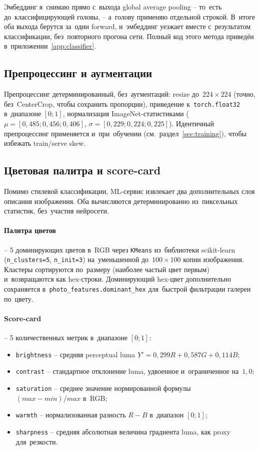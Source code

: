 \documentclass[a4paper,12pt]{diplom}
\begin{document}
Эмбеддинг я~снимаю прямо с~выхода global average pooling -- то~есть до~классифицирующей головы, -- а~голову применяю отдельной строкой. В~итоге оба выхода берутся за~один forward, и~эмбеддинг уезжает вместе с~результатом классификации, без~повторного прогона сети. Полный код этого метода приведён в~приложении~\ref{app:classifier}.

\subsection{Препроцессинг и аугментации}

Препроцессинг детерминированный, без~аугментаций: resize до~$224\times 224$ (точно, без~CenterCrop, чтобы сохранить пропорции), приведение к~\texttt{torch.float32} в~диапазоне $[0;1]$, нормализация ImageNet-статистиками ($\mu = [0{,}485; 0{,}456; 0{,}406]$, $\sigma = [0{,}229; 0{,}224; 0{,}225]$). Идентичный препроцессинг применяется и~при~обучении (см.~раздел~\ref{sec:training}), чтобы избежать train/serve skew.

\subsection{Цветовая палитра и score-card}

Помимо стилевой классификации, ML-сервис извлекает два дополнительных слоя описания изображения. Оба вычисляются детерминированно из~пиксельных статистик, без~участия нейросети.

\paragraph{Палитра цветов} -- 5 доминирующих цветов в~RGB через \texttt{KMeans} из~библиотеки scikit-learn~\cite{ScikitLearn} (\verb|n_clusters=5|, \verb|n_init=3|) на~уменьшенной до~$100\times 100$ копии изображения. Кластеры сортируются по~размеру (наиболее частый цвет первым) и~возвращаются как hex-строки. Доминирующий hex-цвет дополнительно сохраняется в~\verb|photo_features.dominant_hex| для~быстрой фильтрации галереи по~цвету.

\paragraph{Score-card} -- 5 количественных метрик в~диапазоне $[0;1]$:

\begin{itemize}
\item \texttt{brightness} -- средняя perceptual luma $Y' = 0{,}299 R + 0{,}587 G + 0{,}114 B$;
\item \texttt{contrast} -- стандартное отклонение luma, удвоенное и~ограниченное на~$1{,}0$;
\item \texttt{saturation} -- среднее значение нормированной формулы $(max - min) / max$ в~RGB;
\item \texttt{warmth} -- нормализованная разность $R - B$ в~диапазон $[0;1]$;
\item \texttt{sharpness} -- средняя абсолютная величина градиента luma, как proxy для~резкости.
\end{itemize}
\end{document}

